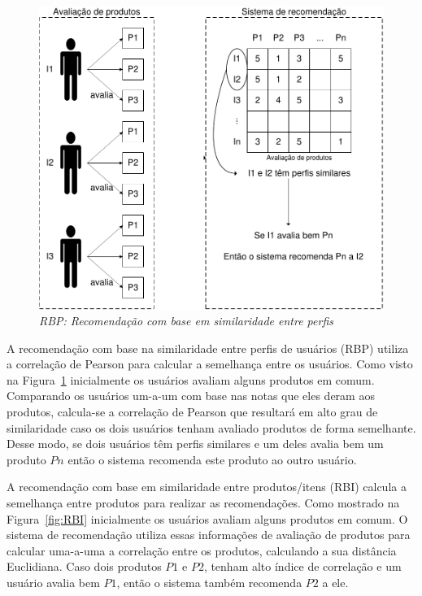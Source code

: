 \begin{figure}
  \centering
  \includegraphics[width=\textwidth]{imagens/RBP}
  \caption{\it RBP: Recomendação com base em similaridade entre perfis}
  \label{fig:RBP}
\end{figure}

 A recomendação com base na similaridade entre perfis de usuários (RBP) utiliza a correlação de Pearson para calcular a semelhança entre os usuários. Como visto na Figura~\ref{fig:RBP} inicialmente os usuários avaliam alguns produtos em comum. Comparando os usuários um-a-um com base nas notas que eles deram aos produtos, calcula-se a correlação de Pearson que resultará em alto grau de similaridade caso os dois usuários tenham avaliado produtos de forma semelhante. Desse modo, se dois usuários têm perfis similares e um deles avalia bem um produto $P{n}$ então o sistema recomenda este produto ao outro usuário.

 A recomendação com base em similaridade entre produtos/itens (RBI) calcula a semelhança entre produtos para realizar as recomendações. Como mostrado na Figura~\ref{fig:RBI} inicialmente os usuários avaliam alguns produtos em comum. O sistema de recomendação utiliza essas informações de avaliação de produtos para calcular uma-a-uma a correlação entre os produtos, calculando a sua distância Euclidiana. Caso dois produtos $P{1}$ e $P{2}$, tenham alto índice de correlação e um usuário avalia bem $P{1}$, então o sistema também recomenda $P{2}$ a ele.

